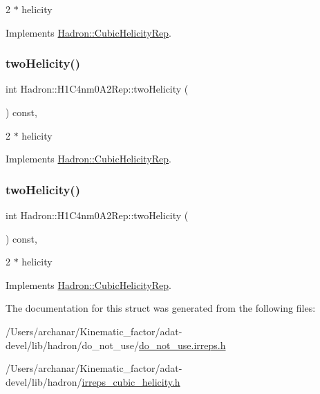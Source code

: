 2 $\ast$ helicity 

Implements \mbox{\hyperlink{structHadron_1_1CubicHelicityRep_af507aa56fc2747eacc8cb6c96db31ecc}{Hadron\+::\+Cubic\+Helicity\+Rep}}.

\mbox{\label{structHadron_1_1H1C4nm0A2Rep_a0cd7ca19a38e71a97d7cbd87c8aa5617}} 
\subsubsection{\texorpdfstring{twoHelicity()}{twoHelicity()}\hspace{0.1cm}{\footnotesize\ttfamily [2/3]}}
{\footnotesize\ttfamily int Hadron\+::\+H1\+C4nm0\+A2\+Rep\+::two\+Helicity (\begin{DoxyParamCaption}{ }\end{DoxyParamCaption}) const\hspace{0.3cm}{\ttfamily [inline]}, {\ttfamily [virtual]}}

2 $\ast$ helicity 

Implements \mbox{\hyperlink{structHadron_1_1CubicHelicityRep_af507aa56fc2747eacc8cb6c96db31ecc}{Hadron\+::\+Cubic\+Helicity\+Rep}}.

\mbox{\label{structHadron_1_1H1C4nm0A2Rep_a0cd7ca19a38e71a97d7cbd87c8aa5617}} 
\subsubsection{\texorpdfstring{twoHelicity()}{twoHelicity()}\hspace{0.1cm}{\footnotesize\ttfamily [3/3]}}
{\footnotesize\ttfamily int Hadron\+::\+H1\+C4nm0\+A2\+Rep\+::two\+Helicity (\begin{DoxyParamCaption}{ }\end{DoxyParamCaption}) const\hspace{0.3cm}{\ttfamily [inline]}, {\ttfamily [virtual]}}

2 $\ast$ helicity 

Implements \mbox{\hyperlink{structHadron_1_1CubicHelicityRep_af507aa56fc2747eacc8cb6c96db31ecc}{Hadron\+::\+Cubic\+Helicity\+Rep}}.



The documentation for this struct was generated from the following files\+:\begin{DoxyCompactItemize}
\item 
/\+Users/archanar/\+Kinematic\+\_\+factor/adat-\/devel/lib/hadron/do\+\_\+not\+\_\+use/\mbox{\hyperlink{adat-devel_2lib_2hadron_2do__not__use_2do__not__use_8irreps_8h}{do\+\_\+not\+\_\+use.\+irreps.\+h}}\item 
/\+Users/archanar/\+Kinematic\+\_\+factor/adat-\/devel/lib/hadron/\mbox{\hyperlink{adat-devel_2lib_2hadron_2irreps__cubic__helicity_8h}{irreps\+\_\+cubic\+\_\+helicity.\+h}}\end{DoxyCompactItemize}

